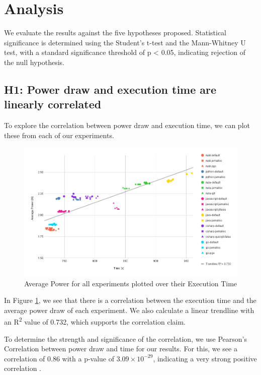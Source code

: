 \documentclass[main.tex]{subfiles}
\begin{document}
\section{Analysis}

We evaluate the results against the five hypotheses proposed. Statistical significance is determined using the Student's t-test and the Mann-Whitney U test, with a standard significance threshold of p < 0.05, indicating rejection of the null hypothesis.

\subsection{H1: Power draw and execution time are linearly correlated}
To explore the correlation between power draw and execution time, we can plot these from each of our experiments. 

\begin{figure}[h]
    \centering
    \includegraphics[width=\linewidth]{media/analysis/AveragePowerOverTime.png}
    \caption{Average Power for all experiments plotted over their Execution Time}
    \label{fig:analysis-energy-time-correlation}
\end{figure}

In Figure \ref{fig:analysis-energy-time-correlation}, we see that there is a correlation between the execution time and the average power draw of each experiment. We also calculate a linear trendline with an R\textsuperscript{2} value of 0.732, which supports the correlation claim.

To determine the strength and significance of the correlation, we use Pearson's Correlation between power draw and time for our results. For this, we see a correlation of 0.86 with a p-value of $3.09\times 10^{-29}$, indicating a very strong positive correlation  \cite{pearson-correlation-table}.
\end{document}
